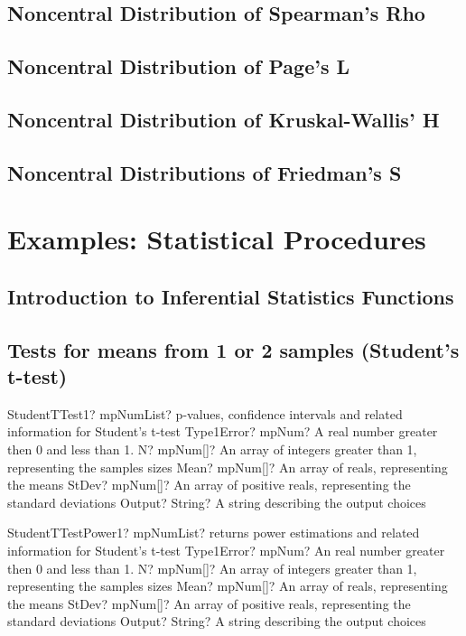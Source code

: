 \documentclass[12pt,a4paper,openany]{book}
\begin{document}
\section{Noncentral Distribution of Spearman's Rho}

\section{Noncentral Distribution of Page's L}

\section{Noncentral Distribution of Kruskal-Wallis' H}

\section{Noncentral Distributions of Friedman's S}

\chapter{Examples: Statistical Procedures}

\section{Introduction to Inferential Statistics Functions}

\section{Tests for means from 1 or 2 samples (Student's t-test)}

\begin{mpFunctionsExtract}
\mpFunctionFiveNotImplemented
{StudentTTest1? mpNumList? p-values, confidence intervals and related information for Student's t-test}
{Type1Error? mpNum? A real number greater then 0 and less than 1.}
{N? mpNum[]? An array of integers greater than 1, representing the samples sizes}
{Mean? mpNum[]? An array of reals, representing the means}
{StDev? mpNum[]? An array of positive reals, representing the standard deviations}
{Output? String? A string describing the output choices}
\end{mpFunctionsExtract}

\begin{mpFunctionsExtract}
\mpFunctionFiveNotImplemented
{StudentTTestPower1? mpNumList? returns power estimations and related information for Student's t-test}
{Type1Error? mpNum? An real number greater then 0 and less than 1.}
{N? mpNum[]? An array of integers greater than 1, representing the samples sizes}
{Mean? mpNum[]? An array of reals, representing the means}
{StDev? mpNum[]? An array of positive reals, representing the standard deviations}
{Output? String? A string describing the output choices}
\end{mpFunctionsExtract}
\end{document}
